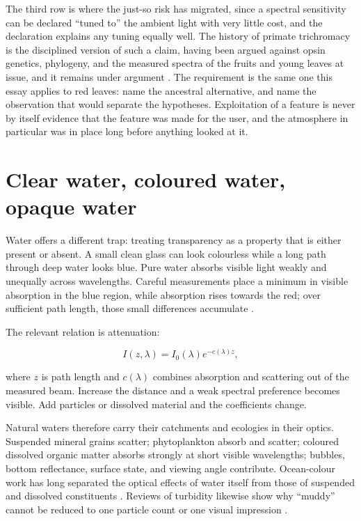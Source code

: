 The third row is where the just-so risk has migrated, since a spectral sensitivity can be declared ``tuned to'' the ambient light with very little cost, and the declaration explains any tuning equally well. The history of primate trichromacy is the disciplined version of such a claim, having been argued against opsin genetics, phylogeny, and the measured spectra of the fruits and young leaves at issue, and it remains under argument \citep{mollon1989}. The requirement is the same one this essay applies to red leaves: name the ancestral alternative, and name the observation that would separate the hypotheses. Exploitation of a feature is never by itself evidence that the feature was made for the user, and the atmosphere in particular was in place long before anything looked at it.

\section{Clear water, coloured water, opaque water}

Water offers a different trap: treating transparency as a property that is either present or absent. A small clean glass can look colourless while a long path through deep water looks blue. Pure water absorbs visible light weakly and unequally across wavelengths. Careful measurements place a minimum in visible absorption in the blue region, while absorption rises towards the red; over sufficient path length, those small differences accumulate \citep{popefry1997}.

The relevant relation is attenuation:

\begin{equation*}
I(z,\lambda)=I_0(\lambda)e^{-c(\lambda)z},
\end{equation*}

where $z$ is path length and $c(\lambda)$ combines absorption and scattering out of the measured beam. Increase the distance and a weak spectral preference becomes visible. Add particles or dissolved material and the coefficients change.

Natural waters therefore carry their catchments and ecologies in their optics. Suspended mineral grains scatter; phytoplankton absorb and scatter; coloured dissolved organic matter absorbs strongly at short visible wavelengths; bubbles, bottom reflectance, surface state, and viewing angle contribute. Ocean-colour work has long separated the optical effects of water itself from those of suspended and dissolved constituents \citep{morel1977}. Reviews of turbidity likewise show why ``muddy'' cannot be reduced to one particle count or one visual impression \citep{daviescolley2001}.

